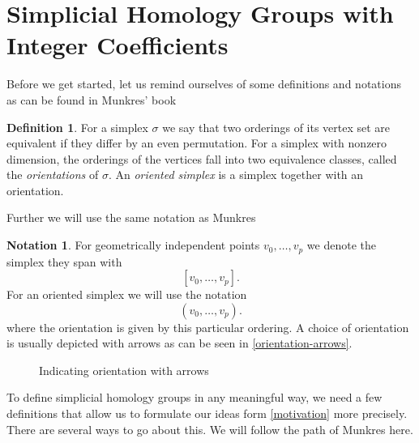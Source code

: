 \documentclass[toc=bib, headinclude]{scrartcl}
\theoremstyle{plain}
\theoremstyle{definition}
\newtheorem	{definition}[theorem]{Definition}
\newtheorem{notation}[theorem]{Notation}
\theoremstyle{remark}
\newcommand{\SH}{Simplicial Homology}
\begin{document}
\section{\SH{} Groups with Integer Coefficients}\label{first-hom}

Before we get started, let us remind ourselves of some definitions and notations as can be found in Munkres' book \cite[p. 26f.]{mu}
\begin{definition}
	For a simplex $\sigma$ we say that two orderings of its vertex set are equivalent if they differ by an even permutation. For a simplex with nonzero dimension, the orderings of the vertices fall into two equivalence classes, called the \textit{orientations} of $\sigma$. An \textit{oriented simplex} is a simplex together with an orientation.
\end{definition}
Further we will use the same notation as Munkres \cite[p. 26]{mu}
\begin{notation}
	For geometrically independent points $v_0,\dots,v_p$ we denote the simplex they span with
	\[
	[v_0,\dots,v_p].
	\]
	For an oriented simplex we will use the notation
	\[
	(v_0,\dots,v_p).
	\]
	where the orientation is given by this particular ordering.
A choice of orientation is usually depicted with arrows as can be seen in \autoref{orientation-arrows}.\end{notation}

\begin{figure}
	\centering

\caption{Indicating orientation with arrows \cite[see][p.27]{mu}\label{orientation-arrows}}
\end{figure}

To define simplicial homology groups in any meaningful way, we need a few definitions that allow us to formulate our ideas form \autoref{motivation} more precisely. There are several ways to go about this. We will follow the path of Munkres \cite[p. 27]{mu} here.
\end{document}

